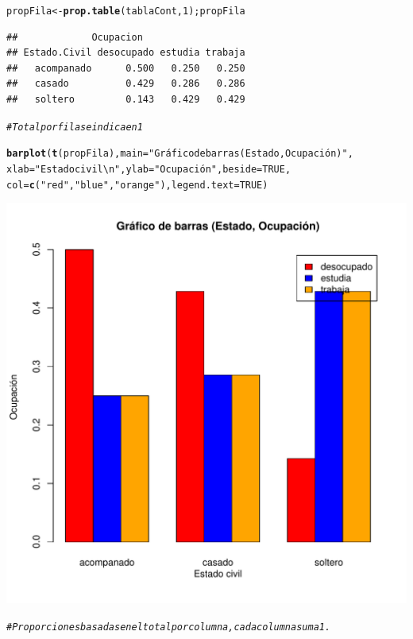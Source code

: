 \documentclass[12pt,letterpaper]{article}\usepackage[]{graphicx}\usepackage[]{color}
\makeatletter
\def\maxwidth{ %
  \ifdim\Gin@nat@width>\linewidth
    \linewidth
  \else
    \Gin@nat@width
  \fi
}
\newcommand{\hlnum}[1]{\textcolor[rgb]{0.686,0.059,0.569}{#1}}%
\newcommand{\hlstr}[1]{\textcolor[rgb]{0.192,0.494,0.8}{#1}}%
\newcommand{\hlcom}[1]{\textcolor[rgb]{0.678,0.584,0.686}{\textit{#1}}}%
\newcommand{\hlstd}[1]{\textcolor[rgb]{0.345,0.345,0.345}{#1}}%
\newcommand{\hlkwb}[1]{\textcolor[rgb]{0.69,0.353,0.396}{#1}}%
\newcommand{\hlkwc}[1]{\textcolor[rgb]{0.333,0.667,0.333}{#1}}%
\newcommand{\hlkwd}[1]{\textcolor[rgb]{0.737,0.353,0.396}{\textbf{#1}}}%
\newenvironment{kframe}{%
 \def\at@end@of@kframe{}%
 \ifinner\ifhmode%
  \def\at@end@of@kframe{\end{minipage}}%
  \begin{minipage}{\columnwidth}%
 \fi\fi%
 \def\FrameCommand##1{\hskip\@totalleftmargin \hskip-\fboxsep
 \colorbox{shadecolor}{##1}\hskip-\fboxsep
     \hskip-\linewidth \hskip-\@totalleftmargin \hskip\columnwidth}%
 \MakeFramed {\advance\hsize-\width
   \@totalleftmargin\z@ \linewidth\hsize
   \@setminipage}}%
 {\par\unskip\endMakeFramed%
 \at@end@of@kframe}
\newenvironment{knitrout}{}{} %
\makeatother
\begin{document}
\begin{enumerate}
\begin{knitrout}
\begin{kframe}
\begin{alltt}
\hlstd{propFila} \hlkwb{<-} \hlkwd{prop.table}\hlstd{(tablaCont,} \hlnum{1}\hlstd{); propFila}
\end{alltt}
\begin{verbatim}
##             Ocupacion
## Estado.Civil desocupado estudia trabaja
##   acompanado      0.500   0.250   0.250
##   casado          0.429   0.286   0.286
##   soltero         0.143   0.429   0.429
\end{verbatim}
\begin{alltt}
\hlcom{# Total por fila se indica en 1 }

\hlkwd{barplot}\hlstd{(}\hlkwd{t}\hlstd{(propFila),} \hlkwc{main}\hlstd{=}\hlstr{"Gráfico de barras (Estado, Ocupación)"}\hlstd{,}
        \hlkwc{xlab}\hlstd{=}\hlstr{"Estado civil\textbackslash{}n"}\hlstd{,} \hlkwc{ylab}\hlstd{=}\hlstr{"Ocupación"}\hlstd{,} \hlkwc{beside}\hlstd{=}\hlnum{TRUE}\hlstd{,}
        \hlkwc{col}\hlstd{=}\hlkwd{c}\hlstd{(}\hlstr{"red"}\hlstd{,} \hlstr{"blue"}\hlstd{,} \hlstr{"orange"}\hlstd{),} \hlkwc{legend.text}\hlstd{=}\hlnum{TRUE}\hlstd{)}
\end{alltt}
\end{kframe}
\includegraphics[width=\maxwidth]{figure/unnamed-chunk-16-1} 

\end{knitrout}

\begin{knitrout}
\color{fgcolor}\begin{kframe}
\begin{alltt}
\hlcom{# Proporciones basadas en el total por columna, cada columna suma 1.}


\end{alltt}
\end{kframe}
\end{knitrout}
\end{enumerate}
\end{document}
